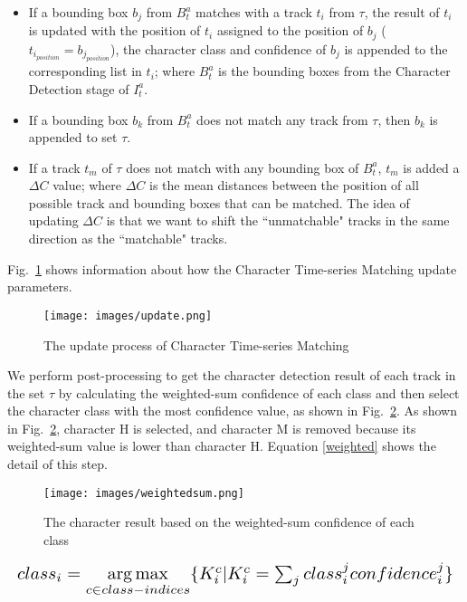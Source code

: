 \documentclass[conference]{IEEEtran}
\begin{document}
\begin{itemize}[]
    \item If a bounding box $b_j$ from $B^{a}_{t}$ matches with a track $t_i$ from $\tau$, the result of $t_i$ is updated with the position of $t_i$ assigned to the position of $b_j$ ($t_{i_{position}}=b_{j_{position}}$), the character class and confidence of $b_j$ is appended to the corresponding list in  $t_i$;  where $B^{a}_{t}$ is the bounding boxes from the Character Detection stage of $I^{a}_{t}$.
    
    \item If a bounding box $b_k$ from $B^{a}_{t}$ does not match any track from $\tau$, then $b_k$  is appended to set $\tau$. 

    \item If a track $t_m$ of $\tau$ does not match with any bounding box of $B^{a}_{t}$, $t_m$ is added a $\Delta C$ value; where $\Delta C$ is the mean distances between the position of all possible track and bounding boxes that can be matched. The idea of updating $\Delta C$ is that we want to shift the ``unmatchable" tracks in the same direction as the ``matchable" tracks.
   
\end{itemize}
Fig.~\ref{updatebox} shows information about how the Character Time-series Matching update parameters. 
\begin{figure}[htp]
  \centering
    \texttt{[image: images/update.png]}
  \caption{The update process of Character Time-series Matching}
  \label{updatebox}
\end{figure}


We perform post-processing to get the character detection result of each track in the set $\tau$  by calculating the weighted-sum confidence of each class and then select the character class with the most confidence value, as shown in Fig.~\ref{weightsum}. As shown in Fig.~\ref{weightsum}, character H is selected, and character M is removed because its weighted-sum value is lower than character H. Equation \ref{weighted} shows the detail of this step.


\begin{figure}[htp]
  \centering
    \texttt{[image: images/weightedsum.png]}
  \caption{The character result based on the weighted-sum confidence of each class}
  \label{weightsum}
\end{figure}




\begin{equation}
\label{weighted}
\resizebox{1\hsize}{!}{$class_i=\underset{c\in class-indices}{\arg\max}\{K^c_i|K^c_i={\sum_{\substack{j}}class_i^j confidence_i^j}\}$}
\end{equation}
\end{document}
